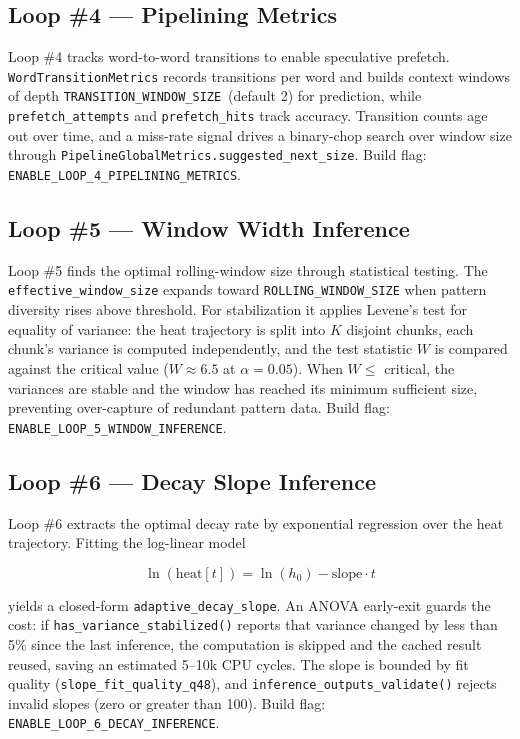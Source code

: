 \subsection{Loop \#4 --- Pipelining Metrics}

Loop \#4 tracks word-to-word transitions to enable speculative prefetch.
\texttt{WordTransitionMetrics} records transitions per word and builds context
windows of depth \texttt{TRANSITION\_WINDOW\_SIZE}~(default 2) for prediction,
while \texttt{prefetch\_attempts} and \texttt{prefetch\_hits} track accuracy.
Transition counts age out over time, and a miss-rate signal drives a binary-chop
search over window size through \texttt{PipelineGlobalMetrics.suggested\_next\_size}.
Build flag: \texttt{ENABLE\_LOOP\_4\_PIPELINING\_METRICS}.

\subsection{Loop \#5 --- Window Width Inference}

Loop \#5 finds the optimal rolling-window size through statistical testing.
The \texttt{effective\_window\_size} expands toward \texttt{ROLLING\_WINDOW\_SIZE}
when pattern diversity rises above threshold. For stabilization it applies
Levene's test for equality of variance: the heat trajectory is split into $K$
disjoint chunks, each chunk's variance is computed independently, and the test
statistic $W$ is compared against the critical value ($W \approx 6.5$ at
$\alpha = 0.05$). When $W \le$ critical, the variances are stable and the window
has reached its minimum sufficient size, preventing over-capture of redundant
pattern data. Build flag: \texttt{ENABLE\_LOOP\_5\_WINDOW\_INFERENCE}.

\subsection{Loop \#6 --- Decay Slope Inference}

Loop \#6 extracts the optimal decay rate by exponential regression over the heat
trajectory. Fitting the log-linear model

\begin{equation}
\ln(\mathrm{heat}[t]) = \ln(h_0) - \mathrm{slope} \cdot t
\end{equation}

yields a closed-form \texttt{adaptive\_decay\_slope}. An ANOVA early-exit guards
the cost: if \texttt{has\_variance\_stabilized()} reports that variance changed
by less than 5\% since the last inference, the computation is skipped and the
cached result reused, saving an estimated 5--10k CPU cycles. The slope is
bounded by fit quality (\texttt{slope\_fit\_quality\_q48}), and
\texttt{inference\_outputs\_validate()} rejects invalid slopes (zero or greater
than 100). Build flag: \texttt{ENABLE\_LOOP\_6\_DECAY\_INFERENCE}.

